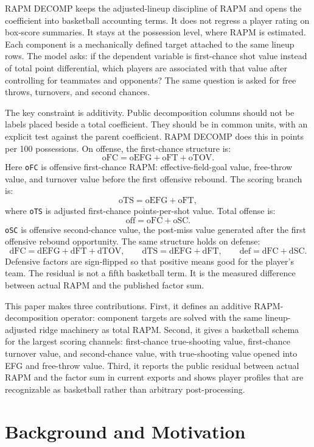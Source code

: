 \documentclass[11pt]{article}
\begin{document}
RAPM DECOMP keeps the adjusted-lineup discipline of RAPM and opens the
coefficient into basketball accounting terms.  It does not regress a player
rating on box-score summaries.  It stays at the possession level, where RAPM is
estimated.  Each component is a mechanically defined target attached to the same
lineup rows.  The model asks: if the dependent variable is first-chance shot
value instead of total point differential, which players are associated with
that value after controlling for teammates and opponents?  The same question is
asked for free throws, turnovers, and second chances.

The key constraint is additivity.  Public decomposition columns should not be
labels placed beside a total coefficient.  They should be in common units, with
an explicit test against the parent coefficient.  RAPM DECOMP does this in
points per 100 possessions.  On offense, the first-chance structure is:
\[
\text{oFC}
= \text{oEFG}
+ \text{oFT}
+ \text{oTOV}.
\]
Here \texttt{oFC} is offensive first-chance RAPM: effective-field-goal value,
free-throw value, and turnover value before the first offensive rebound.  The
scoring branch is:
\[
\text{oTS} = \text{oEFG} + \text{oFT},
\]
where \texttt{oTS} is adjusted first-chance points-per-shot value.  Total
offense is:
\[
\text{off} = \text{oFC} + \text{oSC}.
\]
\texttt{oSC} is offensive second-chance value, the post-miss value generated
after the first offensive rebound opportunity.  The same structure holds on
defense:
\[
\text{dFC} = \text{dEFG} + \text{dFT} + \text{dTOV}, \qquad
\text{dTS} = \text{dEFG} + \text{dFT}, \qquad
\text{def} = \text{dFC} + \text{dSC}.
\]
Defensive factors are sign-flipped so that positive means good for the
player's team.  The residual is not a fifth basketball term.  It is the
measured difference between actual RAPM and the published factor sum.

This paper makes three contributions.  First, it defines an additive
RAPM-decomposition operator: component targets are solved with the same
lineup-adjusted ridge machinery as total RAPM.  Second, it gives a basketball
schema for the largest scoring channels: first-chance true-shooting value,
first-chance turnover value, and second-chance value, with true-shooting value
opened into EFG and free-throw value.  Third, it reports the public residual
between actual RAPM and the factor sum in current exports and shows player
profiles that are recognizable as basketball rather than arbitrary
post-processing.

\section{Background and Motivation}
\end{document}
